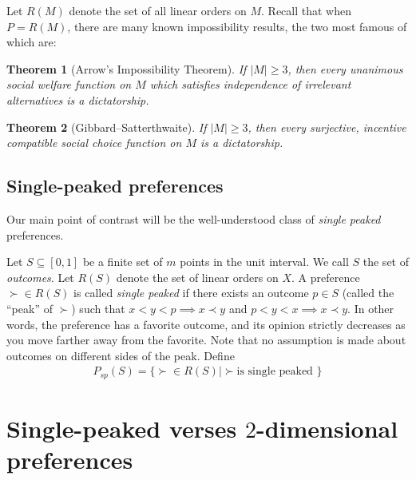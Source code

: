 \documentclass[12pt]{article}
\newtheorem{theorem}{Theorem}
\newcommand{\1}[1]{\mathds{1}[{#1}]}
\begin{document}
    Let $R(M)$ denote the set of all linear orders on $M$.
    Recall that when $P = R(M)$, there are many known impossibility results,
    the two most famous of which are:

    \begin{theorem}[Arrow's Impossibility Theorem]
      If $|M| \ge 3$, then
      every unanimous social welfare function on $M$ which satisfies independence of
      irrelevant alternatives is a dictatorship.
    \end{theorem}

    \begin{theorem}[Gibbard–Satterthwaite]
      If $|M| \ge 3$, then
      every surjective, incentive compatible social choice function on $M$
      is a dictatorship.
    \end{theorem}

  \subsection{Single-peaked preferences}
    Our main point of contrast will be the well-understood class of
    \emph{single peaked} preferences.

    Let $S\subseteq [0,1]$ be a finite set of $m$ points in the unit interval.
    We call $S$ the set of \emph{outcomes}.
    Let $R(S)$ denote the set of linear orders on $X$.
    A preference $\succ \in R(S)$ is called \emph{single peaked} if
    there exists an outcome $p\in S$ (called the ``peak'' of $\succ$)
    such that $x < y < p \implies x \prec y$ and $p < y < x \implies x \prec y$.
    In other words, the preference has a favorite outcome,
    and its opinion strictly decreases as you move farther away from the favorite.
    Note that no assumption is made about outcomes on different sides of the peak.
    Define
    \begin{align*}
      P_{sp}(S) = \{ \succ \in R(S) | \succ \text{is single peaked }\}
    \end{align*}


\section{Single-peaked verses $2$-dimensional preferences}
\end{document}
